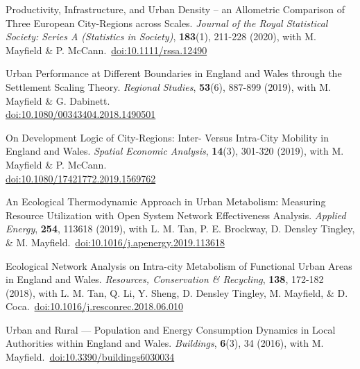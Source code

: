 \documentclass[10pt]{article}
\begin{document}
\begin{etaremune}[leftmargin=0ex, topsep=0ex]
	\item Productivity, Infrastructure, and Urban Density -- an Allometric Comparison of Three European City-Regions across Scales. \emph{Journal of the Royal Statistical Society: Series A (Statistics in Society)}, \textbf{183}(1), 211-228 (2020), with M. Mayfield \& P. McCann.~\href{https://doi.org/10.1111/rssa.12490}{doi:10.1111/rssa.12490}%
		
	\item Urban Performance at Different Boundaries in England and Wales through the Settlement Scaling Theory. \emph{Regional Studies}, \textbf{53}(6), 887-899 (2019), with M. Mayfield \& G. Dabinett.~\\\href{http://dx.doi.org/10.1080/00343404.2018.1490501}{doi:10.1080/00343404.2018.1490501}%
	
	\item On Development Logic of City-Regions: Inter- Versus Intra-City Mobility in England and Wales. \emph{Spatial Economic Analysis}, \textbf{14}(3), 301-320 (2019), with M. Mayfield \& P. McCann.~\\\href{https://doi.org/10.1080/17421772.2019.1569762}{doi:10.1080/17421772.2019.1569762}%

	\item An Ecological Thermodynamic Approach in Urban Metabolism: Measuring Resource Utilization with Open System Network Effectiveness Analysis. \emph{Applied Energy}, \textbf{254}, 113618 (2019), with L. M. Tan, P. E. Brockway, D. Densley Tingley, \& M. Mayfield.~\href{https://doi.org/10.1016/j.apenergy.2019.113618}{doi:10.1016/j.apenergy.2019.113618}%
			
	\item Ecological Network Analysis on Intra-city Metabolism of Functional Urban Areas in England and Wales. \emph{Resources, Conservation \& Recycling}, \textbf{138}, 172-182 (2018), with L. M. Tan, Q. Li, Y. Sheng, D. Densley Tingley, M. Mayfield, \& D. Coca.~\href{https//doi.org/10.1016/j.resconrec.2018.06.010}{doi:10.1016/j.resconrec.2018.06.010}\label{sure.net}%

	\item Urban and Rural --- Population and Energy Consumption Dynamics in Local Authorities within England and Wales. \emph{Buildings}, \textbf{6}(3), 34 (2016), with M. Mayfield.~\href{http://dx.doi.org/10.3390/buildings6030034}{doi:10.3390/buildings6030034}%
	
\end{etaremune}
\renewcommand{\labelenumi}{R\theenumi.}
\end{document}
